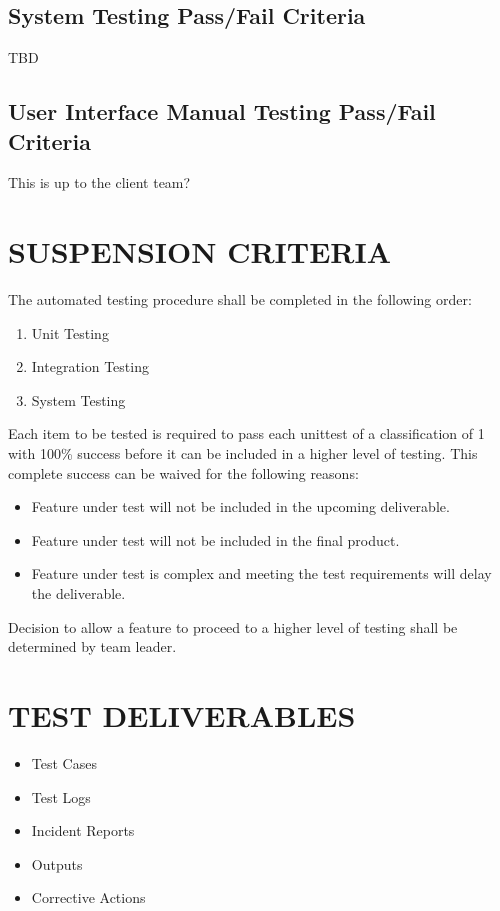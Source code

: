 \documentclass[report]{article}
\begin{document}
\subsection{System Testing Pass/Fail Criteria}
TBD
%

\subsection{User Interface Manual Testing Pass/Fail Criteria}
This is up to the client team?
%

\section[SUSPENSION CRITERIA]{SUSPENSION CRITERIA}
The automated testing procedure shall be completed in the following order:
\begin{enumerate}
\item Unit Testing
\item Integration Testing
\item System Testing
\end{enumerate}
Each item to be tested is required to pass each unittest of a classification of 1 with 100\% success before it can be included in a higher level of testing. This complete success can be waived for the following reasons:
\begin{itemize}
\item Feature under test will not be included in the upcoming deliverable.
\item Feature under test will not be included in the final product.
\item Feature under test is complex and meeting the test requirements will delay the deliverable.
\end{itemize}
Decision to allow a feature to proceed to a higher level of testing shall be determined by team leader.

\section[TEST DELIVERABLES]{TEST DELIVERABLES}
\begin{itemize}
\item Test Cases
\item Test Logs
\item Incident Reports
\item Outputs
\item Corrective Actions
\end{itemize}
\end{document}
